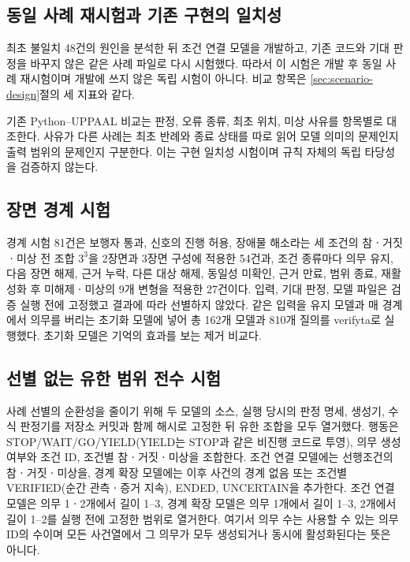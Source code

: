\begin{revision}
\subsection{동일 사례 재시험과 기존 구현의 일치성}
\label{sec:retest-design}
최초 불일치 48건의 원인을 분석한 뒤 조건 연결 모델을 개발하고, 기존 코드와 기대 판정을 바꾸지 않은 같은 사례 파일로 다시 시험했다. 따라서 이 시험은 개발 후 동일 사례 재시험이며 개발에 쓰지 않은 독립 시험이 아니다. 비교 항목은 \ref{sec:scenario-design}절의 세 지표와 같다.

기존 Python--UPPAAL 비교는 판정, 오류 종류, 최초 위치, 미상 사유를 항목별로 대조한다. 사유가 다른 사례는 최초 반례와 종료 상태를 따로 읽어 모델 의미의 문제인지 출력 범위의 문제인지 구분한다. 이는 구현 일치성 시험이며 규칙 자체의 독립 타당성을 검증하지 않는다.

\subsection{장면 경계 시험}
\label{sec:boundary-design}
경계 시험 81건은 보행자 통과, 신호의 진행 허용, 장애물 해소라는 세 조건의 참ㆍ거짓ㆍ미상 전 조합 $3^3$을 2장면과 3장면 구성에 적용한 54건과, 조건 종류마다 의무 유지, 다음 장면 해제, 근거 누락, 다른 대상 해제, 동일성 미확인, 근거 만료, 범위 종료, 재활성화 후 미해제ㆍ미상의 9개 변형을 적용한 27건이다. 입력, 기대 판정, 모델 파일은 검증 실행 전에 고정했고 결과에 따라 선별하지 않았다. 같은 입력을 유지 모델과 매 경계에서 의무를 버리는 초기화 모델에 넣어 총 162개 모델과 810개 질의를 verifyta로 실행했다. 초기화 모델은 기억의 효과를 보는 제거 비교다.

\subsection{선별 없는 유한 범위 전수 시험}
\label{sec:bounded-design}
사례 선별의 순환성을 줄이기 위해 두 모델의 소스, 실행 당시의 판정 명세, 생성기, 수식 판정기를 저장소 커밋과 함께 해시로 고정한 뒤 유한 조합을 모두 열거했다. 행동은 STOP/WAIT/GO/YIELD(YIELD는 STOP과 같은 비진행 코드로 투영), 의무 생성 여부와 조건 ID, 조건별 참ㆍ거짓ㆍ미상을 조합한다. 조건 연결 모델에는 선행조건의 참ㆍ거짓ㆍ미상을, 경계 확장 모델에는 이후 사건의 경계 없음 또는 조건별 VERIFIED(순간 관측ㆍ증거 지속), ENDED, UNCERTAIN을 추가한다. 조건 연결 모델은 의무 1ㆍ2개에서 길이 1--3, 경계 확장 모델은 의무 1개에서 길이 1--3, 2개에서 길이 1--2를 실행 전에 고정한 범위로 열거한다. 여기서 의무 수는 사용할 수 있는 의무 ID의 수이며 모든 사건열에서 그 의무가 모두 생성되거나 동시에 활성화된다는 뜻은 아니다.


\end{revision}
